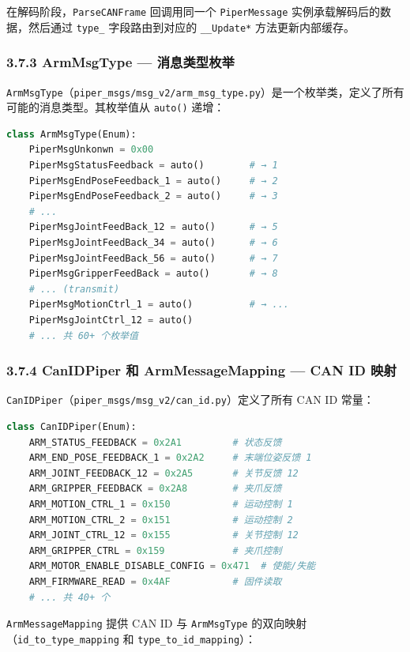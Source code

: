 \documentclass[UTF8,a4paper,11pt]{ctexart}
\begin{document}
在解码阶段，\texttt{ParseCANFrame} 回调用同一个 \texttt{PiperMessage} 实例承载解码后的数据，然后通过 \texttt{type_} 字段路由到对应的 \texttt{__Update*} 方法更新内部缓存。

\subsubsection{3.7.3 ArmMsgType — 消息类型枚举}

\texttt{ArmMsgType}（\texttt{piper_msgs/msg_v2/arm_msg_type.py}）是一个枚举类，定义了所有可能的消息类型。其枚举值从 \texttt{auto()} 递增：

\begin{lstlisting}[language=python]
class ArmMsgType(Enum):
    PiperMsgUnkonwn = 0x00
    PiperMsgStatusFeedback = auto()        # → 1
    PiperMsgEndPoseFeedback_1 = auto()     # → 2
    PiperMsgEndPoseFeedback_2 = auto()     # → 3
    # ...
    PiperMsgJointFeedBack_12 = auto()      # → 5
    PiperMsgJointFeedBack_34 = auto()      # → 6
    PiperMsgJointFeedBack_56 = auto()      # → 7
    PiperMsgGripperFeedBack = auto()       # → 8
    # ... (transmit)
    PiperMsgMotionCtrl_1 = auto()          # → ...
    PiperMsgJointCtrl_12 = auto()
    # ... 共 60+ 个枚举值
\end{lstlisting}

\subsubsection{3.7.4 CanIDPiper 和 ArmMessageMapping — CAN ID 映射}

\texttt{CanIDPiper}（\texttt{piper_msgs/msg_v2/can_id.py}）定义了所有 CAN ID 常量：

\begin{lstlisting}[language=python]
class CanIDPiper(Enum):
    ARM_STATUS_FEEDBACK = 0x2A1         # 状态反馈
    ARM_END_POSE_FEEDBACK_1 = 0x2A2     # 末端位姿反馈 1
    ARM_JOINT_FEEDBACK_12 = 0x2A5       # 关节反馈 12
    ARM_GRIPPER_FEEDBACK = 0x2A8        # 夹爪反馈
    ARM_MOTION_CTRL_1 = 0x150           # 运动控制 1
    ARM_MOTION_CTRL_2 = 0x151           # 运动控制 2
    ARM_JOINT_CTRL_12 = 0x155           # 关节控制 12
    ARM_GRIPPER_CTRL = 0x159            # 夹爪控制
    ARM_MOTOR_ENABLE_DISABLE_CONFIG = 0x471  # 使能/失能
    ARM_FIRMWARE_READ = 0x4AF           # 固件读取
    # ... 共 40+ 个
\end{lstlisting}

\texttt{ArmMessageMapping} 提供 CAN ID 与 \texttt{ArmMsgType} 的双向映射（\texttt{id_to_type_mapping} 和 \texttt{type_to_id_mapping}）：
\end{document}
